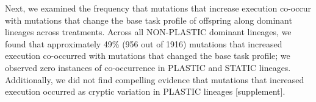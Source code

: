 Next, we examined the frequency that mutations that increase  execution co-occur with mutations that change the base task profile of offspring along dominant lineages across treatments.
Across all NON-PLASTIC dominant lineages, we found that approximately 49\% (956 out of 1916) mutations that increased  execution co-occurred with mutations that changed the base task profile; we observed zero instances of co-occurrence in PLASTIC and STATIC lineages.
Additionally, we did not find compelling evidence that mutations that increased  execution occurred as cryptic variation in PLASTIC lineages [supplement].




